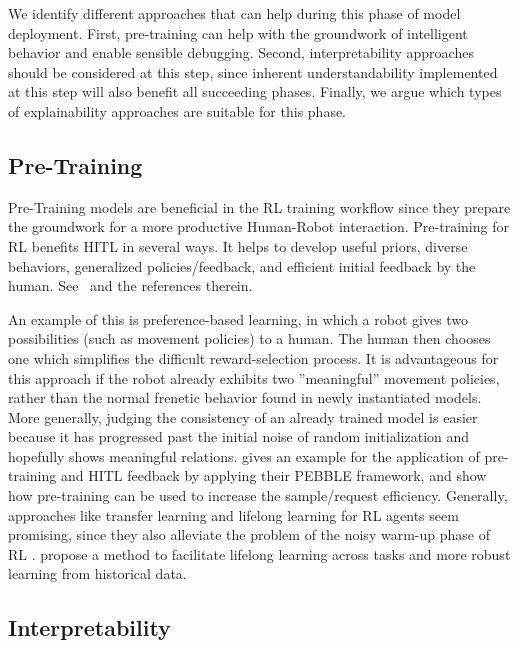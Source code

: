 \documentclass[twoside,11pt]{article}
\begin{document}
\begin{enumerate}
We identify different approaches that can help during this phase of model deployment. First, pre-training can help with the groundwork of intelligent behavior and enable sensible debugging. Second, interpretability approaches should be considered at this step, since inherent understandability implemented at this step will also benefit all succeeding phases. Finally, we argue which types of explainability approaches are suitable for this phase.

\subsection{Pre-Training}
Pre-Training models are beneficial in the RL training workflow since they prepare the groundwork for a more productive Human-Robot interaction. Pre-training for RL benefits HITL in several ways. It helps to 
develop useful priors, diverse behaviors, generalized policies/feedback, and efficient initial feedback by the human. See~\citet{daniel2016hierarchical,eysenbach2018diversity,florensa2017stochastic,hazan2019provably,LeeSmithAbbeel:2021:FeedbackPreferenceHITLLearningPEBBLE} and the references therein.

An example of this is preference-based learning, in which a robot gives two possibilities (such as movement policies) to a human. The human then chooses one which simplifies the difficult reward-selection process. It is advantageous for this approach if the robot already exhibits two ''meaningful'' movement policies, rather than the normal frenetic behavior found in newly instantiated models.
More generally, judging the consistency of an already trained model is easier because it has progressed past the initial noise of random initialization and hopefully shows meaningful relations. \citet{LeeSmithAbbeel:2021:FeedbackPreferenceHITLLearningPEBBLE} gives an example for the application of pre-training and HITL feedback by applying their PEBBLE framework, and show how pre-training can be used to increase the sample/request efficiency.
Generally, approaches like transfer learning and lifelong learning for RL agents seem promising, since they also alleviate the problem of the noisy warm-up phase of RL \citep{taylor2009transfer,yang2021efficient}. \citet{AzarLazaricBrunskill:2013:LifelongLearning} propose a method to facilitate lifelong learning across tasks and more robust learning from historical data.

\subsection{Interpretability}
\label{subsec:interpretability}


\end{enumerate}
\end{document}
